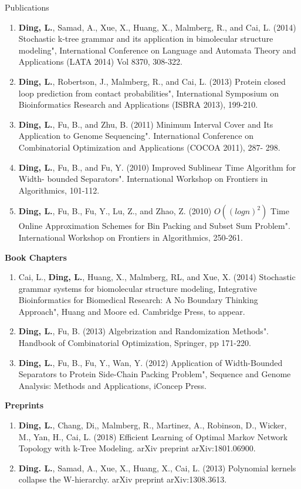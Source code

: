 \documentclass{resume} %
\begin{document}
\begin{rSection}{Publications}
\begin{enumerate}
\item \textbf{Ding, L.}, Samad, A., Xue, X., Huang, X., Malmberg, R., and Cai, L. (2014) Stochastic k-tree grammar and its application in bimolecular structure modeling", International Conference on Language and Automata Theory and Applications (LATA 2014) Vol 8370, 308-322.

\item \textbf{Ding, L.}, Robertson, J., Malmberg, R., and Cai, L. (2013) Protein closed loop prediction from contact probabilities", International Symposium on Bioinformatics Research and Applications (ISBRA 2013), 199-210.

\item \textbf{Ding, L.}, Fu, B., and Zhu, B. (2011) Minimum Interval Cover and Its Application to Genome Sequencing". International Conference on Combinatorial Optimization and Applications (COCOA 2011), 287- 298.

\item \textbf{Ding, L.}, Fu, B., and Fu, Y. (2010) Improved Sublinear Time Algorithm for Width- bounded Separators". International Workshop on Frontiers in Algorithmics, 101-112.

\item \textbf{Ding, L.}, Fu, B., Fu, Y., Lu, Z., and Zhao, Z. (2010) $O((log n)^2)$ Time Online Approximation Schemes for Bin Packing and Subset Sum Problem". International Workshop on Frontiers in Algorithmics, 250-261.
\end{enumerate}


\textbf{Book Chapters}
\begin{enumerate}
\item Cai, L., \textbf{Ding, L.}, Huang, X., Malmberg, RL, and Xue, X. (2014) Stochastic grammar systems for biomolecular structure modeling, Integrative Bioinformatics for Biomedical Research: A No Boundary Thinking Approach", Huang and Moore ed. Cambridge Press, to appear.

\item \textbf{Ding, L.}, Fu, B. (2013) Algebrization and Randomization Methods". Handbook of Combinatorial Optimization, Springer, pp 171-220.

\item \textbf{Ding, L.}, Fu, B., Fu, Y., Wan, Y. (2012) Application of Width-Bounded Separators to Protein Side-Chain Packing Problem", Sequence and Genome Analysis: Methods and Applications, iConcep Press.
\end{enumerate}


\textbf{Preprints}
\begin{enumerate}
\item \textbf{Ding, L.}, Chang, Di,, Malmberg, R., Martinez, A., Robinson, D., Wicker, M., Yan, H., Cai, L. (2018) Efficient Learning of Optimal Markov Network Topology with k-Tree Modeling. arXiv preprint arXiv:1801.06900.

\item \textbf{Ding. L.}, Samad, A., Xue, X., Huang, X., Cai, L. (2013) Polynomial kernels collapse the W-hierarchy. arXiv preprint arXiv:1308.3613.
\end{enumerate}
\end{rSection}
\end{document}
